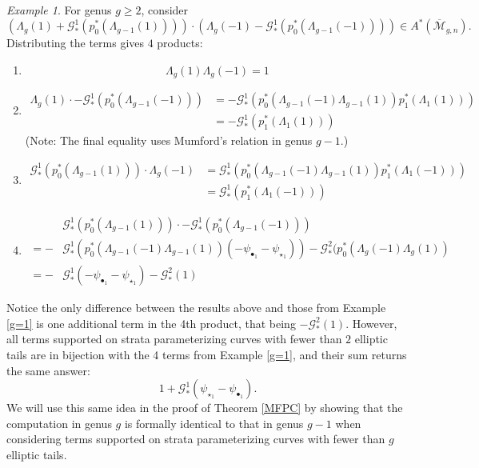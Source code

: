 \documentclass[leqno,12pt]{amsart}
\theoremstyle{remark}
\newtheorem{example}[theorem]{Example}
\numberwithin{equation}{section}
\begin{document}
\begin{example}\label{g=g} For genus $g\geq 2$, consider
$$
 (\Lambda_g(1) + \mathcal{G}_*^1(p_0^\ast(\Lambda_{g-1}(1)))) \cdot (\Lambda_g(-1) - \mathcal{G}_*^1(p_0^\ast(\Lambda_{g-1}(-1)))) \in A^*(\overline{\mathcal{M}}_{g, n}).
$$
Distributing the terms gives $4$ products: 
\begin{enumerate}
    \item $$\Lambda_g(1)\Lambda_g(-1) = 1$$
    \item 
    \begin{align*}
        \Lambda_g(1)\cdot -\mathcal{G}_*^1(p_0^\ast(\Lambda_{g-1}(-1))) &= - \mathcal{G}_*^1(p_0^\ast(\Lambda_{g-1}(-1)\Lambda_{g-1}(1))p_1^\ast(\Lambda_1(1)))\\ &= -\mathcal{G}_*^1(p_1^\ast(\Lambda_1(1)))
    \end{align*}
    (Note: The final equality uses Mumford's relation in genus $g-1$.)
    \item 
    \begin{align*}
        \mathcal{G}_*^1(p_0^\ast(\Lambda_{g-1}(1))) \cdot \Lambda_g(-1) &= \mathcal{G}_*^1(p_0^\ast(\Lambda_{g-1}(-1)\Lambda_{g-1}(1))p_1^\ast(\Lambda_1(-1)))\\ &= \mathcal{G}_*^1(p_1^\ast(\Lambda_1(-1)))
    \end{align*}
    
    \item 
    \begin{align*}
    &\mathcal{G}_*^1(p_0^\ast(\Lambda_{g-1}(1)))\cdot -\mathcal{G}_*^1(p_0^\ast(\Lambda_{g-1}(-1)))\\
    = -&\mathcal{G}_*^1(p_0^\ast(\Lambda_{g-1}(-1)\Lambda_{g-1}(1))(-\psi_{\bullet_1}-\psi_{\star_1})) - \mathcal{G}_\ast^2(p_0^\ast(\Lambda_{g}(-1)\Lambda_{g}(1)) \\
    = -&\mathcal{G}_*^1(-\psi_{\bullet_1}-\psi_{\star_1}) - \mathcal{G}_\ast^2(1)
    \end{align*}
\end{enumerate}
Notice the only difference between the results above and those from Example \ref{g=1} is one additional term in the 4th product, that being $- \mathcal{G}_\ast^2(1)$. However, all terms supported on strata parameterizing curves with fewer than $2$ elliptic tails are in bijection with the 4 terms from Example \ref{g=1}, and their sum returns the same answer: $$1 + \mathcal{G}_*^1(\psi_{\star_1}-\psi_{\bullet_1}).$$
We will use this same idea in the proof of Theorem \ref{MFPC} by showing that the computation in genus $g$ is formally identical to that in genus $g-1$ when considering terms supported on strata parameterizing curves with fewer than $g$ elliptic tails.
\end{example}
\end{document}
